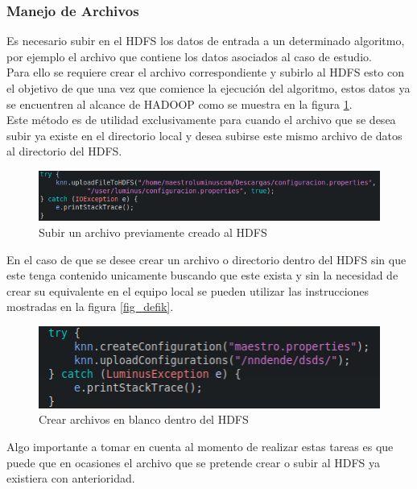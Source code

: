 \subsubsection{Manejo de Archivos} \label{manarch}
Es necesario subir en el HDFS los datos de entrada a un determinado algoritmo, por ejemplo el archivo que contiene los datos asociados al caso de estudio. \\
Para ello se requiere crear el archivo correspondiente y subirlo al HDFS esto con el objetivo de que una vez que comience la ejecución del algoritmo, estos datos ya se encuentren al alcance de HADOOP como se muestra en la figura \ref{fig:defiQ}.\\
Este método es de utilidad exclusivamente para cuando el archivo que se desea subir ya existe en el directorio local y desea subirse este mismo archivo de datos al directorio del HDFS.
\begin{figure}[H]
	\begin{center}
		\hypertarget{fig:defiQ}{\hspace{1pt}}
		\includegraphics[width=.6\textwidth]{capitulo4b/images/uploadFileToHDFS.png}
		\caption{Subir un archivo previamente creado al HDFS}
		\label{fig:defiQ}
	\end{center}
\end{figure}
En el caso de que se desee crear un archivo o directorio dentro del HDFS sin que este tenga contenido unicamente buscando que este exista y sin la necesidad de crear su equivalente en el equipo local se pueden utilizar las instrucciones mostradas en la figura \ref{fig_defik}. \\ 
\begin{figure}[H]
	\begin{center}
		\hypertarget{fig:defik}{\hspace{1pt}}
		\includegraphics[width=.6\textwidth]{capitulo4b/images/crearysubir.png}
		\caption{Crear archivos en blanco dentro del HDFS}
		\label{fig:defik}
	\end{center}
\end{figure}
Algo importante a tomar en cuenta al momento de realizar estas tareas es que puede que en ocasiones el archivo que se pretende crear o subir al HDFS ya existiera con anterioridad. \\
